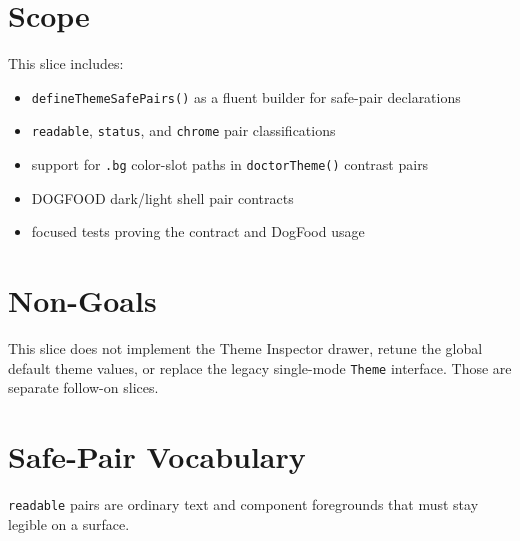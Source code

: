 \section{Scope}\label{record-180-scope}

This slice includes:

\begin{itemize}
\tightlist
\item
  \texttt{d\allowbreak{}e\allowbreak{}f\allowbreak{}i\allowbreak{}n\allowbreak{}e\allowbreak{}T\allowbreak{}h\allowbreak{}e\allowbreak{}m\allowbreak{}e\allowbreak{}S\allowbreak{}a\allowbreak{}f\allowbreak{}e\allowbreak{}P\allowbreak{}a\allowbreak{}i\allowbreak{}r\allowbreak{}s\allowbreak{}(\allowbreak{})} as a fluent builder for safe-pair declarations
\item
  \texttt{r\allowbreak{}e\allowbreak{}a\allowbreak{}d\allowbreak{}a\allowbreak{}b\allowbreak{}l\allowbreak{}e}, \texttt{s\allowbreak{}t\allowbreak{}a\allowbreak{}t\allowbreak{}u\allowbreak{}s}, and \texttt{c\allowbreak{}h\allowbreak{}r\allowbreak{}o\allowbreak{}m\allowbreak{}e} pair classifications
\item
  support for \texttt{.\allowbreak{}b\allowbreak{}g} color-slot paths in \texttt{d\allowbreak{}o\allowbreak{}c\allowbreak{}t\allowbreak{}o\allowbreak{}r\allowbreak{}T\allowbreak{}h\allowbreak{}e\allowbreak{}m\allowbreak{}e\allowbreak{}(\allowbreak{})} contrast pairs
\item
  DOGFOOD dark/light shell pair contracts
\item
  focused tests proving the contract and DogFood usage
\end{itemize}

\section{Non-Goals}\label{record-180-non-goals}

This slice does not implement the Theme Inspector drawer, retune the global default theme values, or replace the legacy single-mode \texttt{T\allowbreak{}h\allowbreak{}e\allowbreak{}m\allowbreak{}e} interface. Those are separate follow-on slices.

\section{Safe-Pair Vocabulary}\label{record-180-safe-pair-vocabulary}

\texttt{r\allowbreak{}e\allowbreak{}a\allowbreak{}d\allowbreak{}a\allowbreak{}b\allowbreak{}l\allowbreak{}e} pairs are ordinary text and component foregrounds that must stay legible on a surface.

